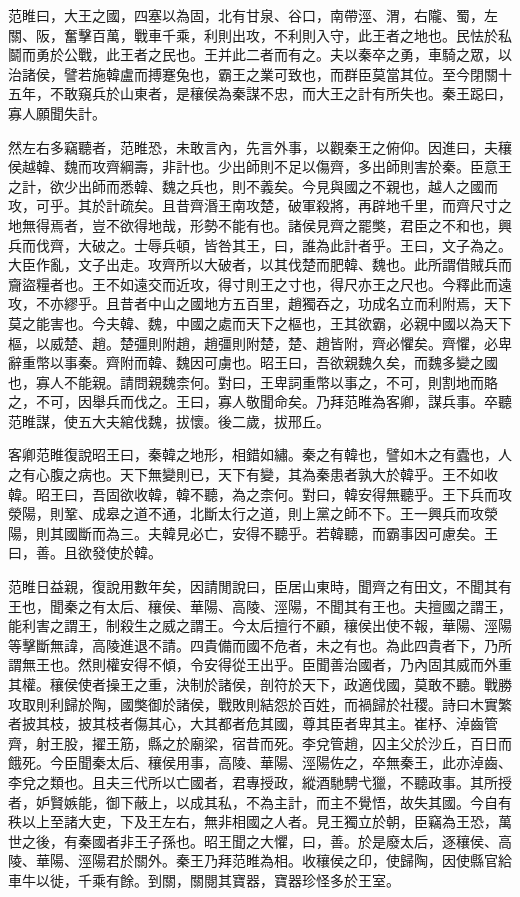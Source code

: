 范睢曰，大王之國，四塞以為固，北有甘泉、谷口，南帶涇、渭，右隴、蜀，左關、阪，奮擊百萬，戰車千乘，利則出攻，不利則入守，此王者之地也。民怯於私鬬而勇於公戰，此王者之民也。王并此二者而有之。夫以秦卒之勇，車騎之眾，以治諸侯，譬若施韓盧而搏蹇兔也，霸王之業可致也，而群臣莫當其位。至今閉關十五年，不敢窺兵於山東者，是穰侯為秦謀不忠，而大王之計有所失也。秦王跽曰，寡人願聞失計。

然左右多竊聽者，范睢恐，未敢言內，先言外事，以觀秦王之俯仰。因進曰，夫穰侯越韓、魏而攻齊綱壽，非計也。少出師則不足以傷齊，多出師則害於秦。臣意王之計，欲少出師而悉韓、魏之兵也，則不義矣。今見與國之不親也，越人之國而攻，可乎。其於計疏矣。且昔齊湣王南攻楚，破軍殺將，再辟地千里，而齊尺寸之地無得焉者，豈不欲得地哉，形勢不能有也。諸侯見齊之罷獘，君臣之不和也，興兵而伐齊，大破之。士辱兵頓，皆咎其王，曰，誰為此計者乎。王曰，文子為之。大臣作亂，文子出走。攻齊所以大破者，以其伐楚而肥韓、魏也。此所謂借賊兵而齎盜糧者也。王不如遠交而近攻，得寸則王之寸也，得尺亦王之尺也。今釋此而遠攻，不亦繆乎。且昔者中山之國地方五百里，趙獨吞之，功成名立而利附焉，天下莫之能害也。今夫韓、魏，中國之處而天下之樞也，王其欲霸，必親中國以為天下樞，以威楚、趙。楚彊則附趙，趙彊則附楚，楚、趙皆附，齊必懼矣。齊懼，必卑辭重幣以事秦。齊附而韓、魏因可虜也。昭王曰，吾欲親魏久矣，而魏多變之國也，寡人不能親。請問親魏柰何。對曰，王卑詞重幣以事之，不可，則割地而賂之，不可，因舉兵而伐之。王曰，寡人敬聞命矣。乃拜范睢為客卿，謀兵事。卒聽范睢謀，使五大夫綰伐魏，拔懷。後二歲，拔邢丘。

客卿范睢復說昭王曰，秦韓之地形，相錯如繡。秦之有韓也，譬如木之有蠹也，人之有心腹之病也。天下無變則已，天下有變，其為秦患者孰大於韓乎。王不如收韓。昭王曰，吾固欲收韓，韓不聽，為之柰何。對曰，韓安得無聽乎。王下兵而攻滎陽，則鞏、成皋之道不通，北斷太行之道，則上黨之師不下。王一興兵而攻滎陽，則其國斷而為三。夫韓見必亡，安得不聽乎。若韓聽，而霸事因可慮矣。王曰，善。且欲發使於韓。

范睢日益親，復說用數年矣，因請閒說曰，臣居山東時，聞齊之有田文，不聞其有王也，聞秦之有太后、穰侯、華陽、高陵、涇陽，不聞其有王也。夫擅國之謂王，能利害之謂王，制殺生之威之謂王。今太后擅行不顧，穰侯出使不報，華陽、涇陽等擊斷無諱，高陵進退不請。四貴備而國不危者，未之有也。為此四貴者下，乃所謂無王也。然則權安得不傾，令安得從王出乎。臣聞善治國者，乃內固其威而外重其權。穰侯使者操王之重，決制於諸侯，剖符於天下，政適伐國，莫敢不聽。戰勝攻取則利歸於陶，國獘御於諸侯，戰敗則結怨於百姓，而禍歸於社稷。詩曰木實繁者披其枝，披其枝者傷其心，大其都者危其國，尊其臣者卑其主。崔杼、淖齒管齊，射王股，擢王筋，縣之於廟梁，宿昔而死。李兌管趙，囚主父於沙丘，百日而餓死。今臣聞秦太后、穰侯用事，高陵、華陽、涇陽佐之，卒無秦王，此亦淖齒、李兌之類也。且夫三代所以亡國者，君專授政，縱酒馳騁弋獵，不聽政事。其所授者，妒賢嫉能，御下蔽上，以成其私，不為主計，而主不覺悟，故失其國。今自有秩以上至諸大吏，下及王左右，無非相國之人者。見王獨立於朝，臣竊為王恐，萬世之後，有秦國者非王子孫也。昭王聞之大懼，曰，善。於是廢太后，逐穰侯、高陵、華陽、涇陽君於關外。秦王乃拜范睢為相。收穰侯之印，使歸陶，因使縣官給車牛以徙，千乘有餘。到關，關閱其寶器，寶器珍怪多於王室。

